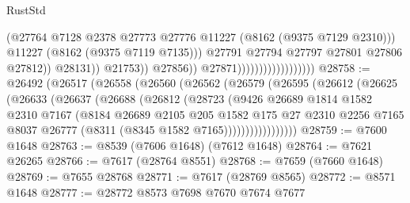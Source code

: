 \begin{lexlean}{RustStd}
\begin{coremodule}
                                                          (@27764
                                                            @7128
                                                            @2378
                                                            @27773
                                                            @27776
                                                            @11227
                                                            (@8162 (@9375 @7129 @2310)))
                                                          @11227
                                                          (@8162 (@9375 @7119 @7135)))
                                                        @27791
                                                        @27794
                                                        @27797
                                                        @27801
                                                        @27806
                                                        @27812))
                                                    @28131))
                                                @21753))
                                            @27856))
                                        @27871))))))))))))))))))
@28758 := @26492
    (@26517
      (@26558
        (@26560
          (@26562
            (@26579
              (@26595
                (@26612
                  (@26625
                    (@26633
                      (@26637
                        (@26688
                          (@26812
                            (@28723
                              (@9426
                                @26689
                                @1814
                                @1582
                                @2310
                                @7167
                                (@8184
                                  @26689
                                  @2105
                                  @205
                                  @1582
                                  @175
                                  @27
                                  @2310
                                  @2256
                                  @7165
                                  @8037
                                  @26777
                                  (@8311 (@8345 @1582 @7165)))))))))))))))))
@28759 := @7600 @1648
@28763 := @8539 (@7606 @1648) (@7612 @1648)
@28764 := @7621 @26265
@28766 := @7617 (@28764 @8551)
@28768 := @7659 (@7660 @1648)
@28769 := @7655 @28768
@28771 := @7617 (@28769 @8565)
@28772 := @8571 @1648
@28777 := @28772 @8573 @7698 @7670 @7674 @7677

\end{coremodule}
\end{lexlean}

